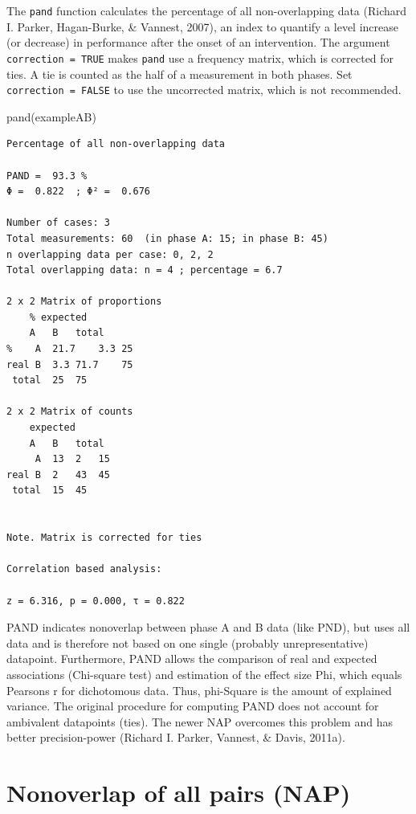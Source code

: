 \documentclass[
  letterpaper,
  DIV=11,
  numbers=noendperiod]{scrreprt}
\newenvironment{Shaded}{\begin{snugshade}}{\end{snugshade}}
\newcommand{\FunctionTok}[1]{\textcolor[rgb]{0.28,0.35,0.67}{#1}}
\newcommand{\NormalTok}[1]{\textcolor[rgb]{0.00,0.23,0.31}{#1}}
\begin{document}
The \texttt{pand} function calculates the percentage of all
non-overlapping data (Richard I. Parker, Hagan-Burke, \& Vannest, 2007),
an index to quantify a level increase (or decrease) in performance after
the onset of an intervention. The argument \texttt{correction\ =\ TRUE}
makes \texttt{pand} use a frequency matrix, which is corrected for ties.
A tie is counted as the half of a measurement in both phases. Set
\texttt{correction\ =\ FALSE} to use the uncorrected matrix, which is
not recommended.

\begin{Shaded}
\begin{Highlighting}[]
\FunctionTok{pand}\NormalTok{(exampleAB)}
\end{Highlighting}
\end{Shaded}

\begin{verbatim}
Percentage of all non-overlapping data

PAND =  93.3 %
Φ =  0.822  ; Φ² =  0.676 

Number of cases: 3 
Total measurements: 60  (in phase A: 15; in phase B: 45)
n overlapping data per case: 0, 2, 2
Total overlapping data: n = 4 ; percentage = 6.7 

2 x 2 Matrix of proportions
    % expected
    A   B   total
%    A  21.7    3.3 25
real B  3.3 71.7    75
 total  25  75

2 x 2 Matrix of counts
    expected
    A   B   total
     A  13  2   15
real B  2   43  45
 total  15  45


Note. Matrix is corrected for ties

Correlation based analysis:

z = 6.316, p = 0.000, τ = 0.822 
\end{verbatim}

PAND indicates nonoverlap between phase A and B data (like PND), but
uses all data and is therefore not based on one single (probably
unrepresentative) datapoint. Furthermore, PAND allows the comparison of
real and expected associations (Chi-square test) and estimation of the
effect size Phi, which equals Pearsons r for dichotomous data. Thus,
phi-Square is the amount of explained variance. The original procedure
for computing PAND does not account for ambivalent datapoints (ties).
The newer NAP overcomes this problem and has better precision-power
(Richard I. Parker, Vannest, \& Davis, 2011a).

\hypertarget{nonoverlap-of-all-pairs-nap}{%
\section{Nonoverlap of all pairs
(NAP)}\label{nonoverlap-of-all-pairs-nap}}
\end{document}
